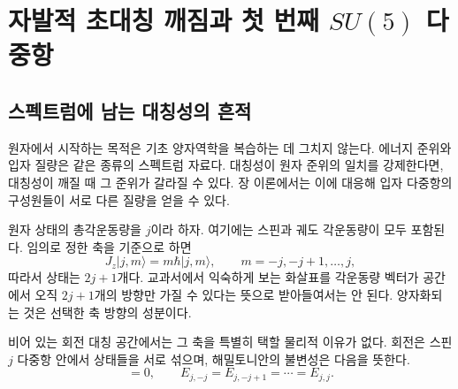 \chapter{자발적 초대칭 깨짐과 첫 번째 \texorpdfstring{\(SU(5)\)}{SU(5)} 다중항}


\section{스펙트럼에 남는 대칭성의 흔적}

원자에서 시작하는 목적은 기초 양자역학을 복습하는 데 그치지 않는다. 에너지 준위와 입자 질량은 같은 종류의 스펙트럼 자료다. 대칭성이 원자 준위의 일치를 강제한다면, 대칭성이 깨질 때 그 준위가 갈라질 수 있다. 장 이론에서는 이에 대응해 입자 다중항의 구성원들이 서로 다른 질량을 얻을 수 있다.

원자 상태의 총각운동량을 \(j\)이라 하자. 여기에는 스핀과 궤도 각운동량이 모두 포함된다. 임의로 정한 축을 기준으로 하면
\begin{equation}
J_z|j,m\rangle=m\hbar|j,m\rangle,
\qquad
m=-j,-j+1,\ldots,j,
\end{equation}
따라서 상태는 \(2j+1\)개다. 교과서에서 익숙하게 보는 화살표를 각운동량 벡터가 공간에서 오직 \(2j+1\)개의 방향만 가질 수 있다는 뜻으로 받아들여서는 안 된다. 양자화되는 것은 선택한 축 방향의 성분이다.

비어 있는 회전 대칭 공간에서는 그 축을 특별히 택할 물리적 이유가 없다. 회전은 스핀 \(j\) 다중항 안에서 상태들을 서로 섞으며, 해밀토니안의 불변성은 다음을 뜻한다.
\begin{equation}
[H,\mathbf J]=0,
\qquad
E_{j,-j}=E_{j,-j+1}=\cdots=E_{j,j}.
\label{eq:l9-degeneracy}
\end{equation}

